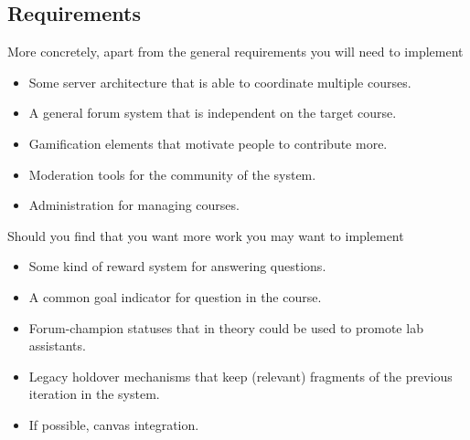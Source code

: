 \begin{refsection}
\subsection{Requirements}
More concretely, apart from the general requirements you will need to implement
\begin{itemize}
    \item Some server architecture that is able to coordinate multiple courses.
    \item A general forum system that is independent on the target course.
    \item Gamification elements that motivate people to contribute more.
    \item Moderation tools for the community of the system.
    \item Administration for managing courses.
\end{itemize}
Should you find that you want more work you may want to implement
\begin{itemize}
    \item Some kind of reward system for answering questions.
    \item A common goal indicator for question in the course.
    \item Forum-champion statuses that in theory could be used to promote lab assistants.
    \item Legacy holdover mechanisms that keep (relevant) fragments of the previous iteration in the system.
    \item If possible, canvas integration.
\end{itemize}

\end{refsection}
